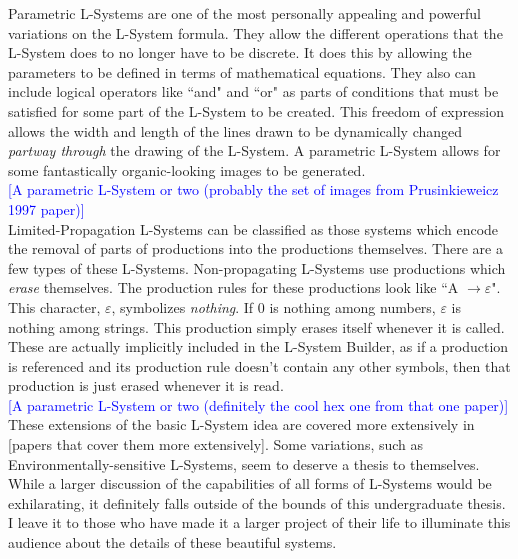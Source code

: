 \documentclass[12pt,twoside]{reedthesis}
\begin{document}
	Parametric L-Systems are one of the most personally appealing and powerful variations on the L-System formula. They allow the different operations that the L-System does to no longer have to be discrete. It does this by allowing the parameters to be defined in terms of mathematical equations. They also can include logical operators like ``and" and ``or" as parts of conditions that must be satisfied for some part of the L-System to be created. This freedom of expression allows the width and length of the lines drawn to be dynamically changed \textit{partway through} the drawing of the L-System. A parametric L-System allows for some fantastically organic-looking images to be generated.\\
	\textcolor{blue}{[A parametric L-System or two (probably the set of images from Prusinkieweicz 1997 paper)]}\\
	
	Limited-Propagation L-Systems can be classified as those systems which encode the removal of parts of productions into the productions themselves. There are a few types of these L-Systems. Non-propagating L-Systems use productions which \textit{erase} themselves. The production rules for these productions look like ``A $\rightarrow \varepsilon$". This character, $\varepsilon$, symbolizes \textit{nothing}. If 0 is nothing among numbers, $\varepsilon$ is nothing among strings. This production simply erases itself whenever it is called. These are actually implicitly included in the L-System Builder, as if a production is referenced and its production rule doesn't contain any other symbols, then that production is just erased whenever it is read.\\
	\textcolor{blue}{[A parametric L-System or two (definitely the cool hex one from that one paper)]}\\
	
	These extensions of the basic L-System idea are covered more extensively in [papers that cover them more extensively]. Some variations, such as Environmentally-sensitive L-Systems, seem to deserve a thesis to themselves. While a larger discussion of the capabilities of all forms of L-Systems would be exhilarating, it definitely falls outside of the bounds of this undergraduate thesis. I leave it to those who have made it a larger project of their life to illuminate this audience about the details of these beautiful systems.\\
	
\end{document}
